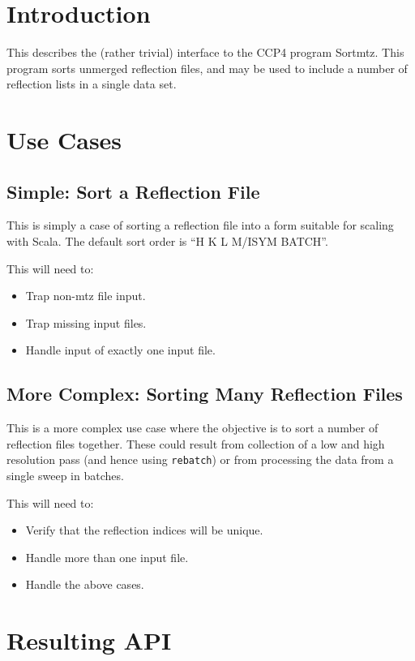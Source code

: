 \documentclass[a4paper, 11pt]{article}
\begin{document}
\section{Introduction}

This describes the (rather trivial) interface to the CCP4 program Sortmtz.
This program sorts unmerged reflection files, and may be used to include 
a number of reflection lists in a single data set.

\section{Use Cases}

\subsection{Simple: Sort a Reflection File}

This is simply a case of sorting a reflection file into a form suitable for
scaling with Scala. The default sort order is ``H K L M/ISYM BATCH''.

This will need to:

\begin{itemize}
\item{Trap non-mtz file input.}
\item{Trap missing input files.}
\item{Handle input of exactly one input file.}
\end{itemize}

\subsection{More Complex: Sorting Many Reflection Files}

This is a more complex use case where the objective is to sort a number
of reflection files together. These could result from collection of a low
and high resolution pass (and hence using \verb|rebatch|) or from processing
the data from a single sweep in batches. 

This will need to:

\begin{itemize}
\item{Verify that the reflection indices will be unique.}
\item{Handle more than one input file.}
\item{Handle the above cases.}
\end{itemize}

\section{Resulting API}
\end{document}
